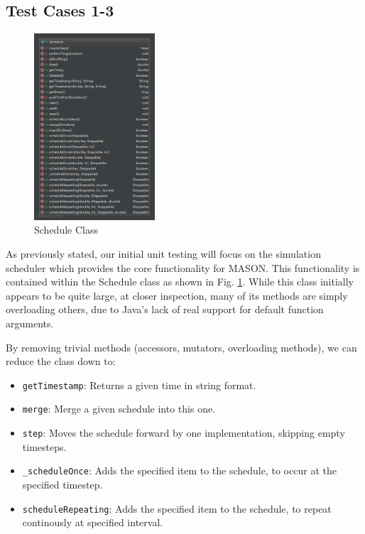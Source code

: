 \documentclass[11pt]{article}
\begin{document}
\subsection{Test Cases 1-3}
\begin{figure} 
  \begin{center}
    \includegraphics[width=0.4\textwidth]{Appendix/Schedule}
    \caption{Schedule Class}
    \label{fig:schedule}
  \end{center}
\end{figure}
As previously stated, our initial unit testing will focus on the simulation scheduler which provides the core functionality for MASON. This functionality is contained within the Schedule class as shown in Fig. \ref{fig:schedule}. While this class initially appears to be quite large, at closer inspection, many of its methods are simply overloading others, due to Java's lack of real support for default function arguments.

By removing trivial methods (accessors, mutators, overloading methods), we can reduce the class down to:
\begin{itemize}
	\item \texttt{getTimestamp}: Returns a given time in string format.
	\item \texttt{merge}: Merge a given schedule into this one.
	\item \texttt{step}: Moves the schedule forward by one implementation, skipping empty timesteps.
	\item \texttt{\_scheduleOnce}: Adds the specified item to the schedule, to occur at the specified timestep.
	\item \texttt{scheduleRepeating}: Adds the specified item to the schedule, to repeat continously at specified interval.
\end{itemize}
\end{document}

